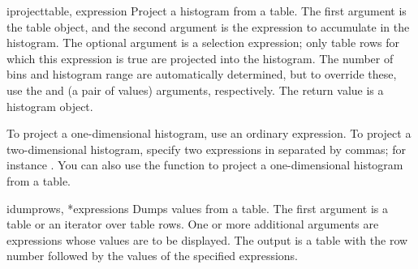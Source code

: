\begin{funcdesc}{iproject}{table, expression}
 Project a histogram from a table.  The first argument is the table
 object, and the second argument is the expression to accumulate in the
 histogram.  The optional  argument is a selection
 expression; only table rows for which this expression is true are
 projected into the histogram.  The number of bins and histogram range
 are automatically determined, but to override these, use the
  and  (a pair of values) arguments,
 respectively.  The return value is a histogram object.

 To project a one-dimensional histogram, use an ordinary expression.  To
 project a two-dimensional histogram, specify two expressions in
  separated by commas; for instance .
 You can also use the  function to project a
 one-dimensional histogram from a table.
\end{funcdesc}

\begin{funcdesc}{idump}{rows, *expressions}
 Dumps values from a table.  The first argument is a table or an
 iterator over table rows.  One or more additional arguments are
 expressions whose values are to be displayed.  The output is a table
 with the row number followed by the values of the specified
 expressions.
\end{funcdesc}

